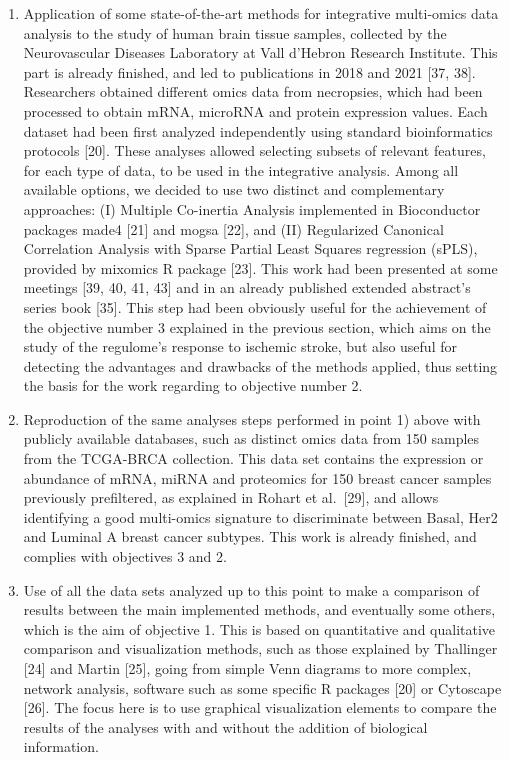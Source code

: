 \documentclass[a4paper, nobind]{templates/ociamthesis}
\begin{document}
\begin{enumerate}
\def\labelenumi{\arabic{enumi}.}
\item
  Application of some state-of-the-art methods for integrative multi-omics data analysis to the study of human brain tissue samples, collected by the Neurovascular Diseases Laboratory at Vall d'Hebron Research Institute. This part is already finished, and led to publications in 2018 and 2021 {[}37, 38{]}. Researchers obtained different omics data from necropsies, which had been processed to obtain mRNA, microRNA and protein expression values. Each dataset had been first analyzed independently using standard bioinformatics protocols {[}20{]}. These analyses allowed selecting subsets of relevant features, for each type of data, to be used in the integrative analysis. Among all available options, we decided to use two distinct and complementary approaches: (I) Multiple Co-inertia Analysis implemented in Bioconductor packages made4 {[}21{]} and mogsa {[}22{]}, and (II) Regularized Canonical Correlation Analysis with Sparse Partial Least Squares regression (sPLS), provided by mixomics R package {[}23{]}. This work had been presented at some meetings {[}39, 40, 41, 43{]} and in an already published extended abstract's series book {[}35{]}. This step had been obviously useful for the achievement of the objective number 3 explained in the previous section, which aims on the study of the regulome's response to ischemic stroke, but also useful for detecting the advantages and drawbacks of the methods applied, thus setting the basis for the work regarding to objective number 2.
\item
  Reproduction of the same analyses steps performed in point 1) above with publicly available databases, such as distinct omics data from 150 samples from the TCGA-BRCA collection. This data set contains the expression or abundance of mRNA, miRNA and proteomics for 150 breast cancer samples previously prefiltered, as explained in Rohart et al.~{[}29{]}, and allows identifying a good multi-omics signature to discriminate between Basal, Her2 and Luminal A breast cancer subtypes. This work is already finished, and complies with objectives 3 and 2.
\item
  Use of all the data sets analyzed up to this point to make a comparison of results between the main implemented methods, and eventually some others, which is the aim of objective 1. This is based on quantitative and qualitative comparison and visualization methods, such as those explained by Thallinger {[}24{]} and Martin {[}25{]}, going from simple Venn diagrams to more complex, network analysis, software such as some specific R packages {[}20{]} or Cytoscape {[}26{]}. The focus here is to use graphical visualization elements to compare the results of the analyses with and without the addition of biological information.

\end{enumerate}
\end{document}

